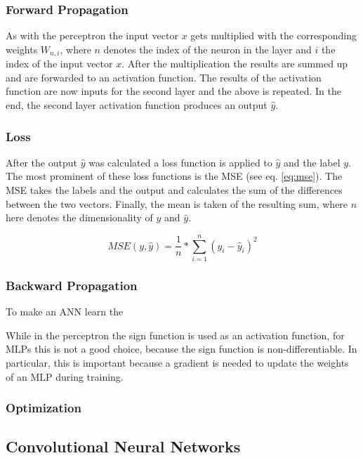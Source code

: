 \subsubsection{Forward Propagation}
As with the perceptron the input vector $x$ gets multiplied with the corresponding weights $W_{n,i}$, where $n$ denotes the index of the neuron in the layer and $i$ the index of the input vector $x$.
After the multiplication the results are summed up and are forwarded to an activation function.
The results of the activation function are now inputs for the second layer and the above is repeated.
In the end, the second layer activation function produces an output $\hat{y}$.

\subsubsection{Loss}
After the output $\hat{y}$ was calculated a loss function is applied to $\hat{y}$ and the  label $y$.
The most prominent of these loss functions is the \ac{MSE} (see eq. \ref{eq:mse}).
The \ac{MSE} takes the labels and the output and calculates the sum of the differences between the two vectors.
Finally, the mean is taken of the resulting sum, where $n$ here denotes the dimensionality of $y$ and $\hat{y}$.

\begin{equation}
    \label{eq:mse}
    MSE(y, \hat{y}) = \frac{1}{n} * \sum_{i=1}^{n}(y_i - \hat{y}_i)^2
\end{equation}

\subsubsection{Backward Propagation}

To make an \ac{ANN} learn the

While in the perceptron the sign function is used as an activation function, for \acp{MLP} this is not a good choice, because the sign function is non-differentiable.
In particular, this is important because a gradient is needed to update the weights of an \ac{MLP} during training.



\subsubsection{Optimization}

\subsection{Convolutional Neural Networks}

